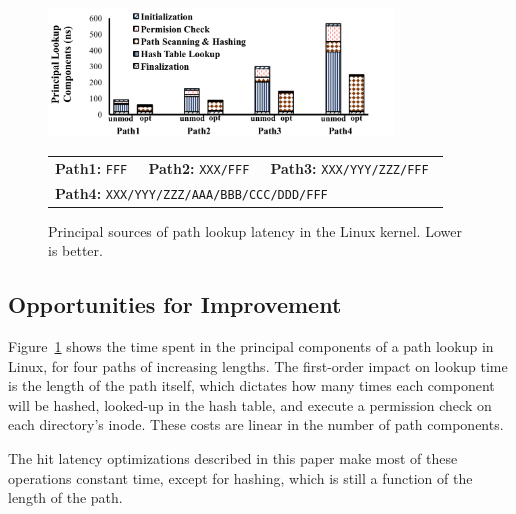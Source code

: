 \begin{figure}
\centering
\includegraphics[width=3.6in]{dcache/plots/lookup-breakdown.pdf} \\
\footnotesize
\begin{tabular}{lll}
{\bf Path1:} \tt FFF &
{\bf Path2:} \tt XXX/FFF &
{\bf Path3:} \tt XXX/YYY/ZZZ/FFF \\
\multicolumn{3}{l}{{\bf Path4:} \tt XXX/YYY/ZZZ/AAA/BBB/CCC/DDD/FFF} \\
\end{tabular}
\caption[Principal sources of path lookup latency.]
{Principal sources of path lookup latency in the Linux \linuxver{} kernel. Lower is better.}
\label{fig:dcache:breakdown}
\end{figure}

\subsection{Opportunities for Improvement}

Figure~\ref{fig:dcache:breakdown} shows the time spent in the principal components
of a path lookup in Linux, for four paths of increasing lengths.
The first-order impact on lookup time is the length of the path itself,
which dictates how many times each component will be hashed, looked-up in the 
hash table, and execute a permission check on each directory's inode.
These costs are linear in the number of path components.


The hit latency optimizations described in this paper make most of these 
operations constant time, except for hashing, which is still a function of the 
length of the path.  


